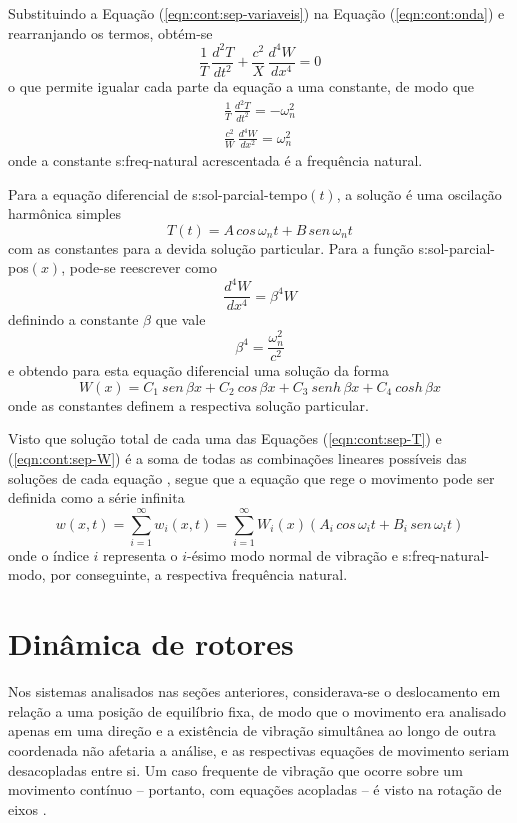 \documentclass[12pt,openright,oneside,a4paper,
	chapter=TITLE,section=TITLE,
	english,brazil]{abntex2}
\begin{document}
	Substituindo a Equação (\ref{eqn:cont:sep-variaveis}) na Equação (\ref{eqn:cont:onda}) e rearranjando os termos, obtém-se 
	\begin{equation} \label{eqn:cont:geral-vigas}
		\frac{1}{T}\,\frac{d^2T}{dt^2} + \frac{\mathit{c}^2}{X}\,\frac{d^4W}{dx^4} = 0
	\end{equation}
	o que permite \cite{clark:1972} igualar cada parte da equação a uma constante, de modo que
	\begin{align*}
		\frac{1}{T}\,\frac{d^2T}{dt^2} = -\omega_n^2 \\
		\frac{\mathit{c}^2}{W}\,\frac{d^4W}{dx^2} = \omega_n^2
	\end{align*}
	onde a constante \gls{s:freq-natural} acrescentada é a frequência natural. 
	
	Para a equação diferencial de \gls{s:sol-parcial-tempo}$(t)$, a solução é uma oscilação harmônica simples 
	\begin{equation} \label{eqn:cont:sep-T}
		T(t) = \mathit{A}\,cos\,\omega_n t + \mathit{B}\,sen\,\omega_n t
	\end{equation}
	com as constantes  para a devida solução particular. Para a função \gls{s:sol-parcial-pos}$(x)$, pode-se reescrever como \[\frac{d^4W}{dx^4} = \beta^4W \] definindo a constante $\beta$ que vale \[\beta^4 = \frac{\omega_n^2}{\mathit{c}^2} \] e obtendo para esta equação diferencial uma solução da forma
	\begin{equation} \label{eqn:cont:sep-W}
		W(x) = C_1\:sen\,\beta x + C_2\:cos\,\beta x + C_3\:senh\,\beta x + C_4\:cosh\,\beta x
	\end{equation}
	onde as constantes  definem a respectiva solução particular.
	
	Visto que solução total de cada uma das Equações (\ref{eqn:cont:sep-T}) e (\ref{eqn:cont:sep-W}) é a soma de todas as combinações lineares possíveis das soluções de cada equação \cite{boyce:2017}, segue que a equação que rege o movimento pode ser definida como a série infinita \cite{clark:1972}
	\begin{equation}
		w(x,t) = \sum_{i=1}^{\infty}w_i(x,t) = \sum_{i=1}^{\infty}W_i(x)(\mathit{A}_i\,cos\,\omega_i t + \mathit{B}_i\,sen\,\omega_i t)
	\end{equation}
	onde o índice $i$ representa o $i$-ésimo modo normal de vibração e \gls{s:freq-natural-modo}, por conseguinte, a respectiva frequência natural.
	
	\section{Dinâmica de rotores}
	Nos sistemas analisados nas seções anteriores, considerava-se o deslocamento em relação a uma posição de equilíbrio fixa, de modo que o movimento era analisado apenas em uma direção e a existência de vibração simultânea ao longo de outra coordenada não afetaria a análise, e as respectivas equações de movimento seriam desacopladas entre si. Um caso frequente de vibração que ocorre sobre um movimento contínuo -- portanto, com equações acopladas -- é visto na rotação de eixos \cite{dimarogonas:1995}.

	\postextual
	
	
		
\end{document}
